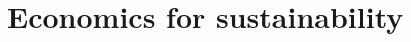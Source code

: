 \documentclass[../summary.tex]{subfiles}
\begin{document}
	
	\section{Economics for sustainability}
	
\end{document}
